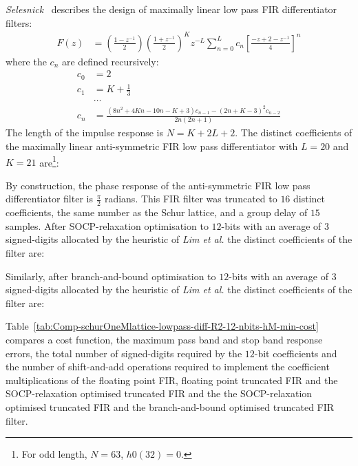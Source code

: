\documentclass[a4paper,twoside,10pt,english]{article}
\begin{document}
\emph{Selesnick}~\cite{Selesnick_MaximallyFlatLowPassDigitalDifferentiators}
describes the design of maximally linear low pass FIR differentiator filters:
\begin{align*}
  F\left(z\right)&=\left(\frac{1-z^{-1}}{2}\right)
                   \left(\frac{1+z^{-1}}{2}\right)^{K}
                   z^{-L}\sum_{n=0}^{L}c_{n}\left[\frac{-z+2-z^{-1}}{4}\right]^{n}
\end{align*}
where the $c_{n}$ are defined recursively:
\begin{align*}
c_{0}&=2\\
c_{1}&=K+\frac{1}{3} \\
    & \hdots \\
c_{n}&=\frac{\left(8n^{2}+4Kn-10n-K+3\right)c_{n-1}-\left(2n+K-3\right)^{2}c_{n-2}}
       {2n\left(2n+1\right)}
\end{align*}
The length of the impulse response is $N=K+2L+2$. The distinct coefficients of
the maximally linear anti-symmetric FIR low pass differentiator with $L=20$ and
$K=21$ are\footnote{For odd length, $N=63$, $h0\left(32\right)=0$.}:
\begin{small}

\end{small}
By construction, the phase response of the anti-symmetric FIR low pass
differentiator filter is $\frac{\pi}{2}$ radians. This FIR filter was truncated
to $16$ distinct coefficients, the same number as the Schur lattice, and a group
delay of $15$ samples. After SOCP-relaxation optimisation to $12$-bits with an
average of $3$ signed-digits allocated by the heuristic of \emph{Lim et al.}
the distinct coefficients of the filter are:
\begin{small}

\end{small}
Similarly, after branch-and-bound optimisation to $12$-bits with an
average of $3$ signed-digits allocated by the heuristic of \emph{Lim et al.}
the distinct coefficients of the filter are:
\begin{small}

\end{small}

Table~\ref{tab:Comp-schurOneMlattice-lowpass-diff-R2-12-nbits-hM-min-cost}
compares a cost function, the maximum pass band and stop band response errors,
the total number of signed-digits required by the $12$-bit coefficients and the
number of shift-and-add operations required to implement the coefficient
multiplications of the floating point FIR, floating point truncated FIR and the
SOCP-relaxation optimised truncated FIR and the the SOCP-relaxation optimised
truncated FIR and the branch-and-bound optimised truncated FIR filter.
\end{document}
